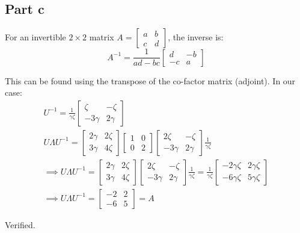 \documentclass{article}
\begin{document}
\subsection*{Part c}
\begin{flushleft}
For an invertible \(2 \times 2\) matrix \(A = \begin{bmatrix} a & b \\ c & d \end{bmatrix}\), the inverse is:
\begin{equation*}
A^{-1} = \frac{1}{ad - bc} \begin{bmatrix} d & -b \\ -c & a \end{bmatrix} 
\end{equation*}

This can be found using the transpose of the co-factor matrix (adjoint). In our case:
\begin{gather*}
U^{-1} = \frac{1}{\gamma \zeta} \begin{bmatrix} \zeta & -\zeta \\ -3\gamma & 2\gamma \end{bmatrix} \\
U\Lambda U^{-1} = \begin{bmatrix} 2\gamma & 2\zeta \\ 3\gamma & 4\zeta \end{bmatrix} \begin{bmatrix} 1 & 0 \\ 0 & 2 \end{bmatrix} \begin{bmatrix} 2\zeta & -\zeta \\ -3\gamma & 2\gamma \end{bmatrix} \frac{1}{\gamma \zeta}\\
\implies U\Lambda U^{-1} = \begin{bmatrix} 2\gamma & 2\zeta \\ 3\gamma & 4 \zeta \end{bmatrix} \begin{bmatrix} 2\zeta & -\zeta \\ -3\gamma & 2\gamma \end{bmatrix} \frac{1}{\gamma \zeta} = \frac{1}{\gamma \zeta} \begin{bmatrix} -2\gamma \zeta & 2\gamma \zeta \\ -6\gamma \zeta & 5\gamma\zeta\end{bmatrix} \\
\implies U\Lambda U^{-1} = \begin{bmatrix} -2 & 2 \\ -6 & 5 \end{bmatrix} = A
\end{gather*}

Verified. 
\end{flushleft}
\end{document}
